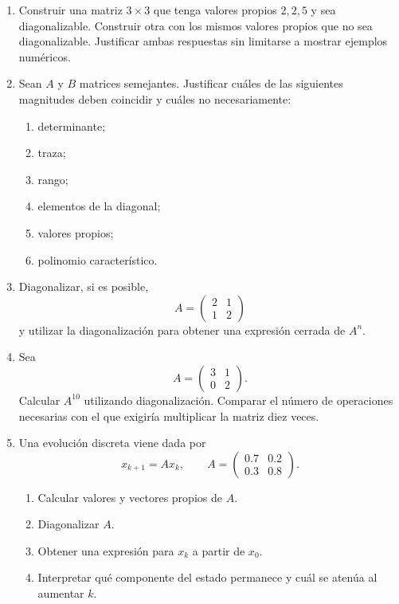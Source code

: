 \begin{enumerate}
\item Construir una matriz $3\times3$ que tenga valores propios $2,2,5$ y sea diagonalizable. Construir otra con los mismos valores propios que no sea diagonalizable. Justificar ambas respuestas sin limitarse a mostrar ejemplos numéricos.

\item Sean $A$ y $B$ matrices semejantes. Justificar cuáles de las siguientes magnitudes deben coincidir y cuáles no necesariamente:
\begin{enumerate}[label=\alph*)]
\item determinante;
\item traza;
\item rango;
\item elementos de la diagonal;
\item valores propios;
\item polinomio característico.
\end{enumerate}

\item Diagonalizar, si es posible,
\[
A=\begin{pmatrix}
2&1\\
1&2
\end{pmatrix}
\]
y utilizar la diagonalización para obtener una expresión cerrada de $A^n$.

\item Sea
\[
A=\begin{pmatrix}
3&1\\
0&2
\end{pmatrix}.
\]
Calcular $A^{10}$ utilizando diagonalización. Comparar el número de operaciones necesarias con el que exigiría multiplicar la matriz diez veces.

\item Una evolución discreta viene dada por
\[
x_{k+1}=Ax_k,
\qquad
A=\begin{pmatrix}
0.7&0.2\\
0.3&0.8
\end{pmatrix}.
\]
\begin{enumerate}[label=\alph*)]
\item Calcular valores y vectores propios de $A$.
\item Diagonalizar $A$.
\item Obtener una expresión para $x_k$ a partir de $x_0$.
\item Interpretar qué componente del estado permanece y cuál se atenúa al aumentar $k$.
\end{enumerate}


\end{enumerate}
